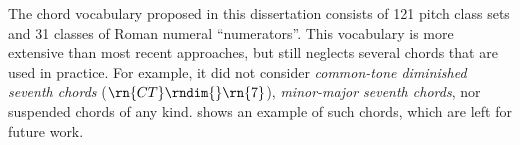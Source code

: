 
The chord vocabulary proposed in this dissertation consists
of 121 pitch class sets and 31 classes of Roman numeral
``numerators''. This vocabulary is more extensive than most
recent approaches, but still neglects several chords that
are used in practice. For example, it did not consider
\emph{common-tone diminished seventh chords}
($\rn{CT}\rndim{}\rn{7}$), \emph{minor-major seventh
chords}, nor suspended chords of any kind.
 shows an example of such chords, which
are left for future work.

